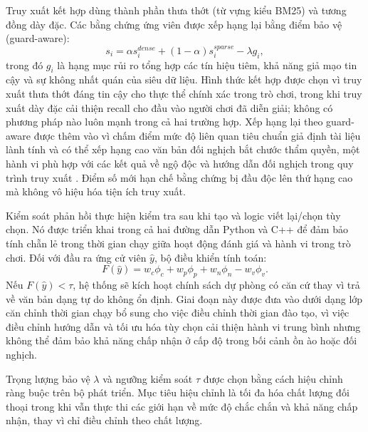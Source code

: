 ﻿\documentclass[a4paper,12pt]{article}
\begin{document}
Truy xuất kết hợp dùng thành phần thưa thớt (từ vựng kiểu BM25) và tương đồng dày đặc. Các bằng chứng ứng viên được xếp hạng lại bằng điểm bảo vệ (guard-aware):
\begin{equation}
s_i = \alpha s_i^{dense} + (1-\alpha)s_i^{sparse} - \lambda g_i,
\end{equation}
trong đó \(g_i\) là hạng mục rủi ro tổng hợp các tín hiệu tiêm, khả năng giả mạo tin cậy và sự không nhất quán của siêu dữ liệu. Hình thức kết hợp được chọn vì truy xuất thưa thớt đáng tin cậy cho thực thể chính xác trong trò chơi, trong khi truy xuất dày đặc cải thiện recall cho đầu vào người chơi đã diễn giải; không có phương pháp nào luôn mạnh trong cả hai trường hợp. Xếp hạng lại theo guard-aware được thêm vào vì chấm điểm mức độ liên quan tiêu chuẩn giả định tài liệu lành tính và có thể xếp hạng cao văn bản đối nghịch bắt chước thẩm quyền, một hành vi phù hợp với các kết quả về ngộ độc và hướng dẫn đối nghịch trong quy trình truy xuất \cite{Zou2025PoisonedRAG,Chaturvedi2025AIP}. Điểm số mới hạn chế bằng chứng bị đầu độc lên thứ hạng cao mà không vô hiệu hóa tiện ích truy xuất.

Kiểm soát phản hồi thực hiện kiểm tra sau khi tạo và logic viết lại/chọn tùy chọn. Nó được triển khai trong cả hai đường dẫn Python và C++ để đảm bảo tính chẵn lẻ trong thời gian chạy giữa hoạt động đánh giá và hành vi trong trò chơi. Đối với đầu ra ứng cử viên \(\hat{y}\), bộ điều khiển tính toán:
\begin{equation}
F(\hat{y}) = w_c\phi_c + w_p\phi_p + w_n\phi_n - w_v\phi_v.
\end{equation}
Nếu \(F(\hat{y}) < \tau\), hệ thống sẽ kích hoạt chính sách dự phòng có căn cứ thay vì trả về văn bản dạng tự do không ổn định. Giai đoạn này được đưa vào dưới dạng lớp căn chỉnh thời gian chạy bổ sung cho việc điều chỉnh thời gian đào tạo, vì việc điều chỉnh hướng dẫn và tối ưu hóa tùy chọn cải thiện hành vi trung bình nhưng không thể đảm bảo khả năng chấp nhận ở cấp độ trong bối cảnh ồn ào hoặc đối nghịch.

Trọng lượng bảo vệ \(\lambda\) và ngưỡng kiểm soát \(\tau\) được chọn bằng cách hiệu chỉnh ràng buộc trên bộ phát triển. Mục tiêu hiệu chỉnh là tối đa hóa chất lượng đối thoại trong khi vẫn thực thi các giới hạn về mức độ chắc chắn và khả năng chấp nhận, thay vì chỉ điều chỉnh theo chất lượng.
\end{document}

